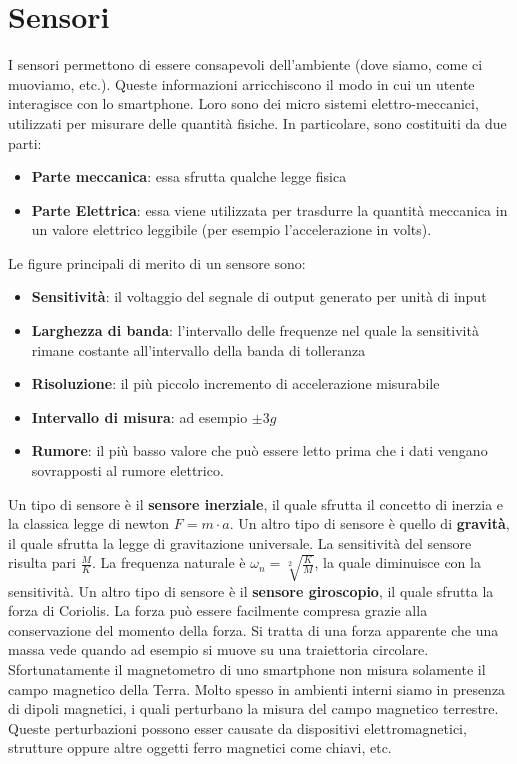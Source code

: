 \chapter{Sensori}
I sensori permettono di essere consapevoli dell'ambiente (dove siamo, come ci muoviamo, etc.). Queste informazioni arricchiscono il modo in cui un utente interagisce con lo smartphone. Loro sono dei micro sistemi elettro-meccanici, utilizzati per misurare delle quantità fisiche. In particolare, sono costituiti da due parti:
\begin{itemize}
    \item \textbf{Parte meccanica}: essa sfrutta qualche legge fisica
    \item \textbf{Parte Elettrica}: essa viene utilizzata per trasdurre la quantità meccanica in un valore elettrico leggibile (per esempio l'accelerazione in volts).
\end{itemize}

Le figure principali di merito di un sensore sono:
\begin{itemize}
    \item \textbf{Sensitività}: il voltaggio del segnale di output generato per unità di input
    \item \textbf{Larghezza di banda}: l'intervallo delle frequenze nel quale la sensitività rimane costante all'intervallo della banda di tolleranza
    \item \textbf{Risoluzione}: il più piccolo incremento di accelerazione misurabile
    \item \textbf{Intervallo di misura}: ad esempio $ \pm 3g$
    \item \textbf{Rumore}: il più basso valore che può essere letto prima che i dati vengano sovrapposti al rumore elettrico.
\end{itemize}

Un tipo di sensore è il \textbf{sensore inerziale}, il quale sfrutta il concetto di inerzia e la classica legge di newton $F = m\cdot a$. Un altro tipo di sensore è quello di \textbf{gravità}, il quale sfrutta la legge di gravitazione universale.
La sensitività del sensore risulta pari $\frac{M}{K}$. La frequenza naturale è $\omega_n = \sqrt[2]{\frac{K}{M}}$, la quale diminuisce con la sensitività.
Un altro tipo di sensore è il \textbf{sensore giroscopio}, il quale sfrutta la forza di Coriolis. La forza può essere facilmente compresa grazie alla conservazione del momento della forza. Si tratta di una forza apparente che una massa vede quando ad esempio si muove su una traiettoria circolare. Sfortunatamente il magnetometro di uno smartphone non misura solamente il campo magnetico della Terra. Molto spesso in ambienti interni siamo in presenza di dipoli magnetici, i quali perturbano la misura del campo magnetico terrestre. Queste perturbazioni possono esser causate da dispositivi elettromagnetici, strutture oppure altre oggetti ferro magnetici come chiavi, etc.

